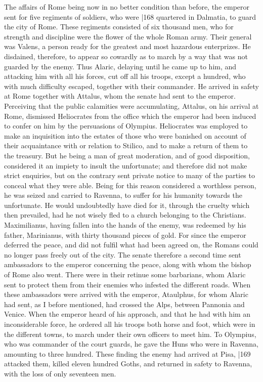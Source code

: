 The affairs of Rome being now in no better condition than before, the emperor sent for five regiments of soldiers, who were
|168 quartered in Dalmatia, to guard the city of Rome. These regiments consisted of six thousand men, who for strength and discipline were the flower of the whole Roman army. Their general was Valens, a person ready for the greatest and most hazardous enterprizes. He disdained, therefore, to appear so cowardly as to march by a way that was not guarded by the enemy. Thus Alaric, delaying until he came up to him, and attacking him with all his forces, cut off all his troops, except a hundred, who with much difficulty escaped, together with their commander. He arrived in safety at Rome together with Attalus, whom the senate had sent to the emperor. Perceiving that the public calamities were accumulating, Attalus, on his arrival at Rome, dismissed Heliocrates from the office which the emperor had been induced to confer on him by the persuasions of Olympius. Heliocrates was employed to make an inquisition into the estates of those who were banished on account of their acquaintance with or relation to Stilico, and to make a return of them to the treasury. But he being a man of great moderation, and of good disposition, considered it an impiety to insult the unfortunate; and therefore did not make strict enquiries, but on the contrary sent private notice to many of the parties to conceal what they were able. Being for this reason considered a worthless person, he was seized and carried to Ravenna, to suffer for his humanity towards the unfortunate. He would undoubtedly have died for it, through the cruelty which then prevailed, had he not wisely fled to a church belonging to the Christians. Maximilianus, having fallen into the hands of the enemy, was redeemed by his father, Marinianus, with thirty thousand pieces of gold. For since the emperor deferred the peace, and did not fulfil what had been agreed on, the Romans could no longer pass freely out of the city. The senate therefore a second time sent ambassadors to the emperor concerning the peace, along with whom the bishop of Rome also went. There were in their retinue some barbarians, whom Alaric sent to protect them from their enemies who infested the different roads. When these ambassadors were arrived with the emperor, Ataulphus, for whom Alaric had sent, as I before mentioned, had crossed the Alps, between Pannonia and Venice. When the emperor heard of his approach, and that he had with him an inconsiderable force, he ordered all his troops both horse and foot, which were in the different towns, to march under their own officers to meet him. To Olympius, who was commander of the court guards, he gave the Huns who were in Ravenna, amounting to three hundred. These finding the enemy had arrived at Pisa,
|169 attacked them, killed eleven hundred Goths, and returned in safety to Ravenna, with the loss of only seventeen men.

